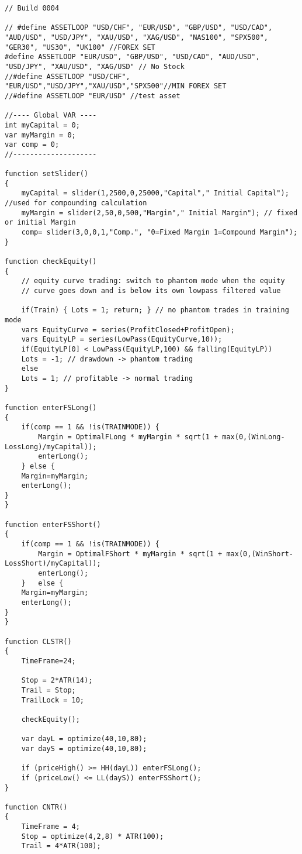\begin{lstlisting}[caption=System]
// Build 0004

// #define ASSETLOOP "USD/CHF", "EUR/USD", "GBP/USD", "USD/CAD", "AUD/USD", "USD/JPY", "XAU/USD", "XAG/USD", "NAS100", "SPX500", "GER30", "US30", "UK100" //FOREX SET
#define ASSETLOOP "EUR/USD", "GBP/USD", "USD/CAD", "AUD/USD", "USD/JPY", "XAU/USD", "XAG/USD" // No Stock
//#define ASSETLOOP "USD/CHF", "EUR/USD","USD/JPY","XAU/USD","SPX500"//MIN FOREX SET
//#define ASSETLOOP "EUR/USD" //test asset

//---- Global VAR ----
int myCapital = 0;
var myMargin = 0;
var comp = 0;
//--------------------

function setSlider()
{
	myCapital = slider(1,2500,0,25000,"Capital"," Initial Capital"); //used for compounding calculation
	myMargin = slider(2,50,0,500,"Margin"," Initial Margin"); // fixed or initial Margin 
	comp= slider(3,0,0,1,"Comp.", "0=Fixed Margin 1=Compound Margin");
}

function checkEquity()
{
	// equity curve trading: switch to phantom mode when the equity 
	// curve goes down and is below its own lowpass filtered value
	
	if(Train) { Lots = 1; return; } // no phantom trades in training mode
	vars EquityCurve = series(ProfitClosed+ProfitOpen);
	vars EquityLP = series(LowPass(EquityCurve,10));
	if(EquityLP[0] < LowPass(EquityLP,100) && falling(EquityLP))
	Lots = -1; // drawdown -> phantom trading
	else
	Lots = 1; // profitable -> normal trading
}

function enterFSLong()
{
	if(comp == 1 && !is(TRAINMODE)) {
		Margin = OptimalFLong * myMargin * sqrt(1 + max(0,(WinLong-LossLong)/myCapital));
		enterLong();
	} else {
	Margin=myMargin;
	enterLong();
}
}

function enterFSShort()
{
	if(comp == 1 && !is(TRAINMODE)) {
		Margin = OptimalFShort * myMargin * sqrt(1 + max(0,(WinShort-LossShort)/myCapital));
		enterLong();
	}	else {
	Margin=myMargin;
	enterLong();	
}
}

function CLSTR()
{
	TimeFrame=24;
	
	Stop = 2*ATR(14);
	Trail = Stop;
	TrailLock = 10;
	
	checkEquity();	
	
	var dayL = optimize(40,10,80);
	var dayS = optimize(40,10,80);
	
	if (priceHigh() >= HH(dayL)) enterFSLong();
	if (priceLow() <= LL(dayS)) enterFSShort();	
}

function CNTR()
{
	TimeFrame = 4;
	Stop = optimize(4,2,8) * ATR(100);
	Trail = 4*ATR(100);
	

\end{lstlisting}
